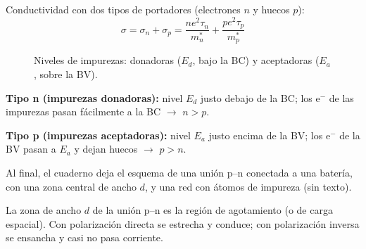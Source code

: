 \documentclass[11pt,a4paper]{article}
\begin{document}
Conductividad con dos tipos de portadores (electrones $n$ y huecos $p$):
\[
\boxed{\sigma=\sigma_n+\sigma_p=\frac{ne^2\tau_n}{m_n^*}+\frac{pe^2\tau_p}{m_p^*}}
\]

\begin{figure}[H]
\centering
{}
\caption{Niveles de impurezas: donadoras ($E_d$, bajo la BC) y aceptadoras ($E_a$, sobre la BV).}
\end{figure}

\textbf{Tipo n (impurezas donadoras):} nivel $E_d$ justo debajo de la BC; los e$^-$ de las impurezas pasan fácilmente a la BC
$\rightarrow$ $n>p$.

\textbf{Tipo p (impurezas aceptadoras):} nivel $E_a$ justo encima de la BV; los e$^-$ de la BV pasan a $E_a$ y dejan huecos
$\rightarrow$ $p>n$.

Al final, el cuaderno deja el esquema de una unión p--n conectada a una batería, con una zona central de ancho $d$, y una red con átomos
de impureza (sin texto).

\begin{obs}
La zona de ancho $d$ de la unión p--n es la región de agotamiento (o de carga espacial). Con polarización directa se estrecha y conduce;
con polarización inversa se ensancha y casi no pasa corriente.
\end{obs}
\end{document}
